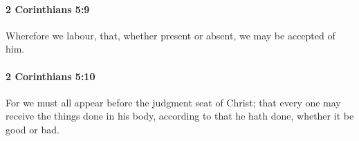 		\paragraph{2 Corinthians 5:9} %
			\label{2CORINTHIANS-5-9}

			Wherefore we labour, that, whether present or absent, we may be accepted of him.

			\begin{framed}
			\scriptsize
				\begin{compactdesc}
					\item[SBLG] 
				\end{compactdesc}
			\end{framed}

		\paragraph{2 Corinthians 5:10} %
			\label{2CORINTHIANS-5-10}

			For we must all appear before the judgment seat of Christ; that every one may receive the things done in his body, according to that he hath done, whether it be good or bad.


